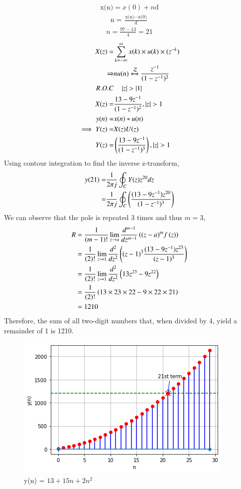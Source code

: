 \documentclass[journal,12pt,twocolumn]{IEEEtran}
\theoremstyle{remark}
\begin{document}
  \begin{align}
      \text{x(n)}=x(0)+n{\text{d}}
  \end{align}
  \begin{align}
    \text{n} = \frac{\text{x(n)} - \text{x(0)}}{\text{d}} 
  \end{align}
  \begin{align}
      n=\frac{97-13}{4}=21
  \end{align}
\begin{align}
X(z)=&\sum\limits^{\infty}_{k=-\infty}{x(k)\times u(k)\times(z^{-k}})\\
\Rightarrow& nu(n) \xleftrightarrow{\mathcal{Z}} \frac{z^{-1}}{(1 - z^{-1})^{2}}\\
R.O.C&\quad\abs{z}>\abs{1}\\
X(z)=&\frac{13-9z^{-1}}{(1-z^{-1})^2},|z|>1\\
y(n)=&x(n)*u(n)\\\implies Y(z)=&X(z)U(z)\\Y(z)=&\brak{\frac{13-9z^{-1}}{(1-z^{-1})^{3}}},|z|>1
\end{align}
Using contour integration to find the inverse z-transform,
\begin{align}
    y(21)=&\frac{1}{2\pi j}\oint_{C}Y(z) z^{20} dz  \\=&\frac{1}{2\pi j}\oint_{C}\left(\frac{(13-9z^{-1})z^{20}}{(1-z^{-1})^{3}}\right)
\end{align}
We can observe that the pole is repeated $3$ times and thus $m=3$,
\begin{align}
    R&=\frac{1}{\left(m-1\right)!}\lim\limits_{z\to a}\frac{d^{m-1}}{dz^{m-1}}\left({(z-a)}^{m}f\left(z\right)\right)  \\&=\frac{1}{\left(2\right)!}\lim\limits_{z\to 1}\frac{d^{2}}{dz^{2}}\left({(z-1)}^{3}\frac{(13-9z^{-1})z^{23}}{(z-1)^{3}}\right)\\&=\frac{1}{\left(2\right)!}\lim\limits_{z\to 1}\frac{d^{2}}{dz^{2}}\left(13z^{23}-9z^{22}\right)\\&=\frac{1}{\left(2\right)!}\left(13\times 23\times 22-9\times 22\times21\right)\\&=1210
\end{align}
Therefore, the sum of all two-digit numbers that, when divided by 4, yield a remainder of 1 is 1210.\\
\begin{figure}[h]
  \centering
  \includegraphics[width=\columnwidth]{Graph/plot1.png}
  \caption{y(n) = $13 + 15n+2n^2$}
  \label{fig:graph}
\end{figure}
\end{document}
